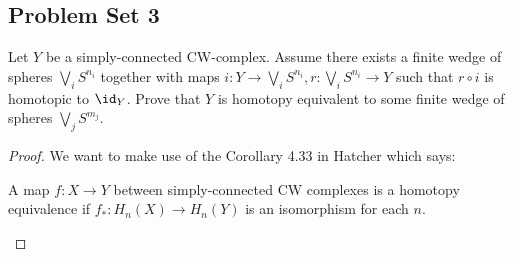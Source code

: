 \subsection{Problem Set 3}
    \begin{problem}[]
        Let $Y$ be a simply-connected CW-complex. Assume
        there exists a finite wedge of spheres
        $\bigvee_{i} S^{n_i}$ together with maps
        $i \colon Y \to \bigvee_{i} S^{n_i},
        r\colon \bigvee_{i} S^{n_i} \to Y$ such that
        $r \circ i$ is homotopic to $\id_Y$.
        Prove that $Y$ is homotopy equivalent to some
        finite wedge of spheres 
        $\bigvee_{j} S^{m_j}$.
    \end{problem}


    \begin{proof}
        We want
        to make use of the Corollary 4.33 in Hatcher which says:
        \begin{corollary}[4.33 Hatcher]
            A map $f \colon X \to Y$ between simply-connected
            CW complexes is a homotopy equivalence if 
            $f_* \colon H_n (X) \to H_n(Y)$ is an isomorphism
            for each $n$.
        \end{corollary}


\end{proof}
